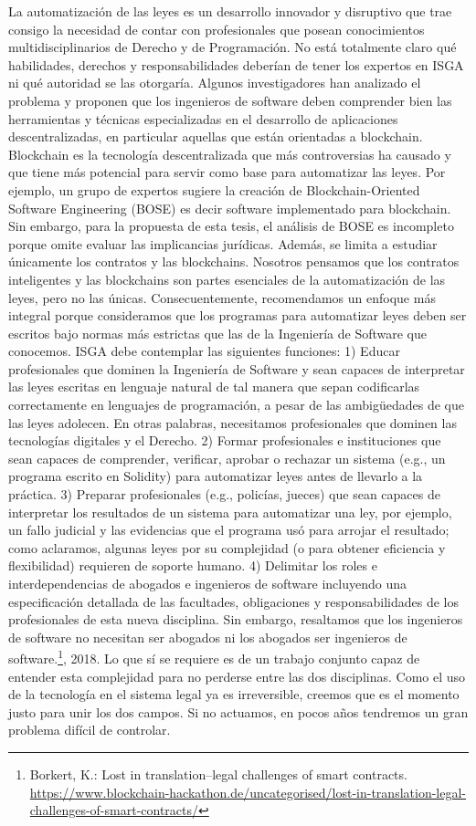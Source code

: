 \documentclass[12pt]{report} %
\begin{document}
La automatización de las leyes es un desarrollo innovador y disruptivo que trae consigo la necesidad de contar con profesionales que posean conocimientos multidisciplinarios de Derecho y de Programación. No está totalmente claro qué habilidades, derechos y responsabilidades deberían de tener los expertos en ISGA ni qué autoridad se las otorgaría. Algunos investigadores han analizado el problema y proponen que los ingenieros de software deben comprender bien las herramientas y técnicas especializadas en el desarrollo de aplicaciones descentralizadas, en particular aquellas que están orientadas a blockchain. Blockchain es la tecnología descentralizada que más controversias ha causado y que tiene más potencial para servir como base para automatizar las leyes. Por ejemplo, un grupo de expertos sugiere la creación de Blockchain-Oriented Software Engineering (BOSE) es decir software implementado para blockchain. Sin embargo, para la propuesta de esta tesis, el análisis de BOSE es incompleto porque omite evaluar las implicancias jurídicas. Además, se limita a estudiar únicamente los contratos y las blockchains. Nosotros pensamos que los contratos inteligentes y las blockchains son partes esenciales de la automatización de las leyes, pero no las únicas. Consecuentemente, recomendamos un enfoque más integral porque consideramos que los programas para automatizar leyes deben ser escritos bajo normas más estrictas que las de la Ingeniería de Software que conocemos. ISGA debe contemplar las siguientes funciones: 1) Educar profesionales que dominen la Ingeniería de Software y sean capaces de interpretar las leyes escritas en lenguaje natural de tal manera que sepan codificarlas correctamente en lenguajes de programación, a pesar de las ambigüedades de que las leyes adolecen. En otras palabras, necesitamos profesionales que dominen las tecnologías digitales y el Derecho. 2) Formar profesionales e instituciones que sean capaces de comprender, verificar, aprobar o rechazar un sistema (e.g., un programa escrito en Solidity) para automatizar leyes antes de llevarlo a la práctica. 3) Preparar profesionales (e.g., policías, jueces) que sean capaces de interpretar los resultados de un sistema para automatizar una ley, por ejemplo, un fallo judicial y las evidencias que el programa usó para arrojar el resultado; como aclaramos, algunas leyes por su complejidad (o para obtener eficiencia y flexibilidad) requieren de soporte humano. 4) Delimitar los roles e interdependencias de abogados e ingenieros de software incluyendo una especificación detallada de las facultades, obligaciones y responsabilidades de los profesionales de esta nueva disciplina. Sin embargo, resaltamos que los ingenieros de software no necesitan ser abogados ni los abogados ser ingenieros de software.\footnote{Borkert, K.: Lost in translation–legal challenges of smart contracts. \url{https://www.blockchain-hackathon.de/uncategorised/lost-in-translation-legal-challenges-of-smart-contracts/}}, 2018.
 Lo que sí se requiere es de un trabajo conjunto capaz de entender esta complejidad para no perderse entre las dos disciplinas. Como el uso de la tecnología en el sistema legal ya es irreversible, creemos que es el momento justo para unir los dos campos. Si no actuamos, en pocos años tendremos un gran problema difícil de controlar.
\end{document}
